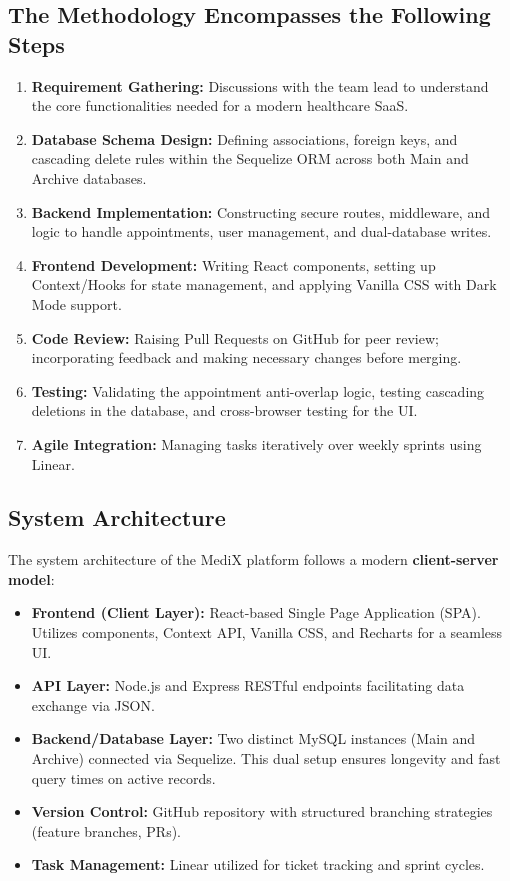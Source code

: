 \documentclass[12pt,a4paper]{article}
\begin{document}
\subsection{The Methodology Encompasses the Following Steps}

\begin{enumerate}
    \item \textbf{Requirement Gathering:} Discussions with the team lead to understand the core functionalities needed for a modern healthcare SaaS.
    \item \textbf{Database Schema Design:} Defining associations, foreign keys, and cascading delete rules within the Sequelize ORM across both Main and Archive databases.
    \item \textbf{Backend Implementation:} Constructing secure routes, middleware, and logic to handle appointments, user management, and dual-database writes.
    \item \textbf{Frontend Development:} Writing React components, setting up Context/Hooks for state management, and applying Vanilla CSS with Dark Mode support.
    \item \textbf{Code Review:} Raising Pull Requests on GitHub for peer review; incorporating feedback and making necessary changes before merging.
    \item \textbf{Testing:} Validating the appointment anti-overlap logic, testing cascading deletions in the database, and cross-browser testing for the UI.
    \item \textbf{Agile Integration:} Managing tasks iteratively over weekly sprints using Linear.
\end{enumerate}

\subsection{System Architecture}

The system architecture of the MediX platform follows a modern \textbf{client-server model}:

\begin{itemize}
    \item \textbf{Frontend (Client Layer):} React-based Single Page Application (SPA). Utilizes components, Context API, Vanilla CSS, and Recharts for a seamless UI.
    \item \textbf{API Layer:} Node.js and Express RESTful endpoints facilitating data exchange via JSON.
    \item \textbf{Backend/Database Layer:} Two distinct MySQL instances (Main and Archive) connected via Sequelize. This dual setup ensures longevity and fast query times on active records.
    \item \textbf{Version Control:} GitHub repository with structured branching strategies (feature branches, PRs).
    \item \textbf{Task Management:} Linear utilized for ticket tracking and sprint cycles.
\end{itemize}
\end{document}
